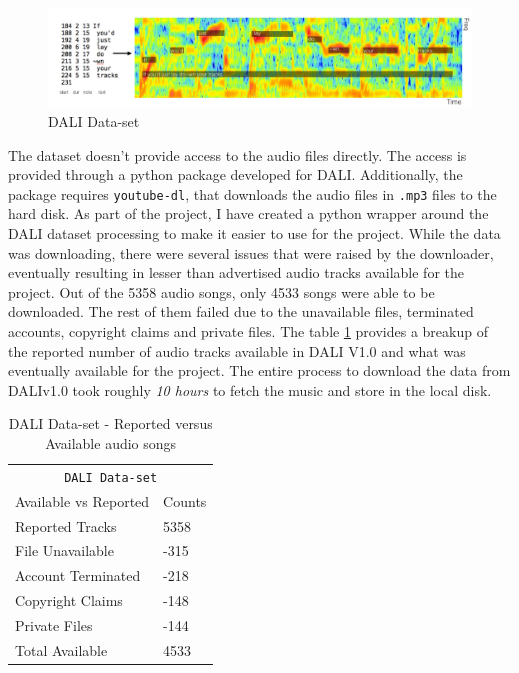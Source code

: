 \begin{figure}
    \centering
    \includegraphics[width=1.0\textwidth]{05-research study/figures/dalidataset.pdf}
    \caption{DALI Data-set}
    \label{fig:dalidataset}
\end{figure}

The dataset doesn't provide access to the audio files directly. The access is provided through a python package developed for DALI. Additionally, the package requires \texttt{youtube-dl}, that downloads the audio files in \texttt{.mp3} files to the hard disk. As part of the project, I have created a python wrapper around the DALI dataset processing to make it easier to use for the project. While the data was downloading, there were several issues that were raised by the downloader, eventually resulting in lesser than advertised audio tracks available for the project. Out of the 5358 audio songs, only 4533 songs were able to be downloaded. The rest of them failed due to the unavailable files, terminated accounts, copyright claims and private files. The
table \ref{dali-table} provides a breakup of the reported number of audio tracks available in DALI V1.0 and what was eventually available for the project. The entire process to download the data from DALIv1.0 took roughly \textit{10 hours} to fetch the music and store in the local disk.

\renewcommand{\arraystretch}{2}
\setlength{\arrayrulewidth}{0.3mm}
\begin{table}[H]
\small
\begin{center}
\begin{tabular}{ |p{6cm}| p{3cm}| }
\multicolumn{2}{c}{\texttt{DALI Data-set}} \\
\cline{1-2}
 Available vs Reported     & Counts  \\
\hline \hline
 Reported Tracks    & 5358  \\
 File Unavailable   & -315   \\
 Account Terminated & -218   \\
 Copyright Claims   & -148   \\
 Private Files      & -144   \\
 \hline \hline
 Total Available    & 4533  \\
 \hline \hline
\end{tabular}
\caption{\label{dali-table} DALI Data-set - Reported versus Available audio songs}
\end{center}
\end{table}

